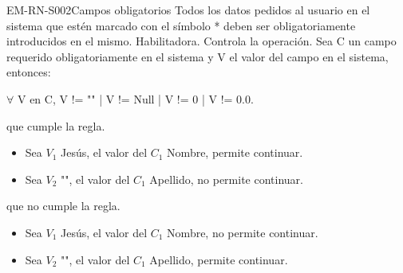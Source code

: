 \begin{BussinesRule}{EM-RN-S002}{Campos obligatorios}
	\BRitem[Descripción:]Todos los datos pedidos al usuario en el sistema
	que estén marcado con el símbolo * deben ser obligatoriamente introducidos en el mismo.
	\BRitem[Tipo:] Habilitadora.
	\BRitem[Nivel:] Controla la operación.
	\BRitem[Sentencia:] Sea C un campo requerido obligatoriamente en el sistema y V el valor del campo en el sistema, entonces: 
		\begin{center}
			$\forall$ V en C, V != "" | V != Null | V != 0 | V != 0.0.
		\end{center}
	 que cumple la regla.
		\begin{itemize}
			\item Sea $V_{1}$ Jesús, el valor del $C_{1}$ Nombre, permite continuar.
			\item Sea $V_{2}$ "", el valor del $C_{1}$ Apellido, no permite continuar.
		\end{itemize}
	 que no cumple la regla.
		\begin{itemize}
			\item Sea $V_{1}$ Jesús, el valor del $C_{1}$ Nombre, no permite continuar.
			\item Sea $V_{2}$ "", el valor del $C_{1}$ Apellido, permite continuar.
		\end{itemize}
\end{BussinesRule}

